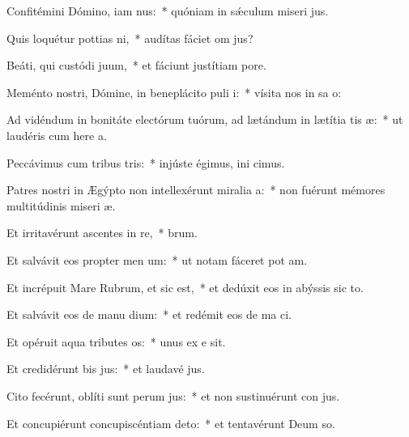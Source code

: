\item Confitémini Dómino, iam nus:~* quóniam in sǽculum miseri jus.
\item Quis loquétur pottias ni,~* audítas fáciet om  jus?
\item Beáti, qui custódi juum,~* et fáciunt justítiam   pore.
\item Meménto nostri, Dómine, in beneplácito puli i:~* vísita nos in sa o:
\item Ad vidéndum in bonitáte electórum tuórum, ad lætándum in lætítia tis æ:~* ut laudéris cum here a.
\item Peccávimus cum tribus tris:~* injúste égimus, ini cimus.
\item Patres nostri in Ægýpto non intellexérunt miralia a:~* non fuérunt mémores multitúdinis miseri æ.
\item Et irritavérunt ascentes in re,~*  brum.
\item Et salvávit eos propter men um:~* ut notam fáceret pot am.
\item Et incrépuit Mare Rubrum, et sic est,~* et dedúxit eos in abýssis sic  to.
\item Et salvávit eos de manu dium:~* et redémit eos de ma ci.
\item Et opéruit aqua tributes os:~* unus ex e  sit.
\item Et credidérunt bis jus:~* et laudavé  jus.
\item Cito fecérunt, oblíti sunt perum jus:~* et non sustinuérunt con jus.
\item Et concupiérunt concupiscéntiam  deto:~* et tentavérunt Deum  so.

